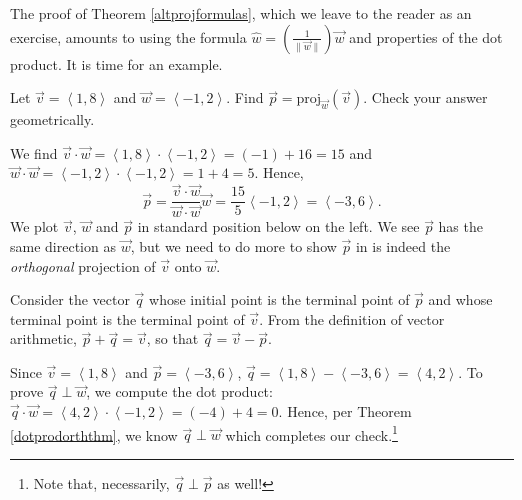 \documentclass{ximera}
\begin{document}
 

The proof of Theorem \ref{altprojformulas}, which we leave to the reader as an exercise, amounts to using the formula $\hat{w} = \left(\frac{1}{\| \overrightarrow{w} \|}\right) \overrightarrow{w}$ and properties of the dot product.  It is time for an example.

 

\begin{example} \label{projex}  Let $\overrightarrow{v} = \left<1,8\right>$ and $\overrightarrow{w} = \left<-1,2\right>$.  Find $\overrightarrow{p} = \text{proj}_{\overrightarrow{w}}(\overrightarrow{v})$.  Check your answer geometrically.

\begin{explanation}
We find $\overrightarrow{v} \cdot \overrightarrow{w} = \left<1,8\right> \cdot \left<-1,2\right> = (-1) + 16 = 15$ and $\overrightarrow{w} \cdot \overrightarrow{w} = \left<-1,2\right> \cdot \left<-1,2\right> = 1 + 4 = 5$.  Hence, \[\overrightarrow{p} = \frac{\overrightarrow{v} \cdot \overrightarrow{w}}{\overrightarrow{w} \cdot \overrightarrow{w}} \overrightarrow{w} = \frac{15}{5} \left<-1,2\right> = \left<-3,6\right> .\] We plot $\overrightarrow{v}$, $\overrightarrow{w}$ and $\overrightarrow{p}$ in standard position below on the left. We see $\overrightarrow{p}$ has the same direction as $\overrightarrow{w}$, but we need to do more to show  $\overrightarrow{p}$ in is indeed the \textit{orthogonal} projection of $\overrightarrow{v}$ onto $\overrightarrow{w}$. 

 

Consider the vector $\overrightarrow{q}$ whose initial point is the terminal point of $\overrightarrow{p}$ and whose terminal point is the terminal point of $\overrightarrow{v}$.  From the definition of vector arithmetic, $\overrightarrow{p} + \overrightarrow{q} = \overrightarrow{v}$, so that $\overrightarrow{q} = \overrightarrow{v} - \overrightarrow{p}$.  

 

Since $\overrightarrow{v} = \left<1,8\right>$ and $\overrightarrow{p} = \left<-3,6\right>$,  $\overrightarrow{q} = \left<1,8\right> - \left<-3,6\right> = \left<4,2\right>$.  To prove $\overrightarrow{q} \perp \overrightarrow{w}$, we compute the dot product:  $\overrightarrow{q} \cdot \overrightarrow{w} = \left<4,2\right> \cdot \left<-1,2\right> = (-4)+4  = 0$.  Hence, per  Theorem \ref{dotprodorththm}, we know $\overrightarrow{q} \perp \overrightarrow{w}$ which completes our check.\footnote{Note that, necessarily, $\overrightarrow{q} \perp \overrightarrow{p}$ as well!}


\end{explanation}
\end{example}
\end{document}
